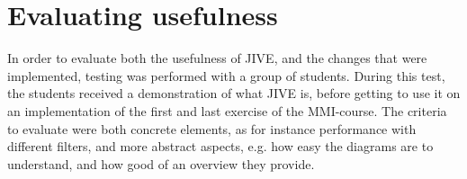 \section{Evaluating usefulness}\label{jiveEval}
In order to evaluate both the usefulness of JIVE, and the changes that were implemented, testing was performed with a group of students.
During this test, the students received a demonstration of what JIVE is, before getting to use it on an implementation of the first and last exercise of the MMI-course.
The criteria to evaluate were both concrete elements, as for instance performance with different filters, and more abstract aspects, e.g. how easy the diagrams are to understand, and how good of an overview they provide.